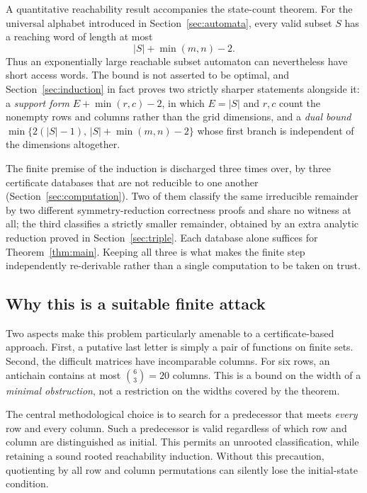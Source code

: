 \documentclass[11pt,letterpaper]{article}
\numberwithin{equation}{section}
\theoremstyle{definition}
\theoremstyle{remark}
\begin{document}
A quantitative reachability result accompanies the state-count theorem.
For the universal alphabet introduced in Section~\ref{sec:automata}, every
valid subset $S$ has a reaching word of length at most
\begin{equation}\label{eq:word-bound-intro}
 |S|+\min(m,n)-2.
\end{equation}
Thus an exponentially large reachable subset automaton can nevertheless
have short access words. The bound is not asserted to be optimal, and
Section~\ref{sec:induction} in fact proves two strictly sharper statements
alongside it: a \emph{support form} $E+\min(r,c)-2$, in which $E=|S|$ and
$r,c$ count the nonempty rows and columns rather than the grid dimensions,
and a \emph{dual bound} $\min\{2(|S|-1),\,|S|+\min(m,n)-2\}$ whose first
branch is independent of the dimensions altogether.

The finite premise of the induction is discharged three times over, by three
certificate databases that are not reducible to one another
(Section~\ref{sec:computation}). Two of them classify the same irreducible
remainder by two different symmetry-reduction correctness proofs and share no
witness at all; the third classifies a strictly smaller remainder, obtained by
an extra analytic reduction proved in Section~\ref{sec:triple}. Each database
alone suffices for Theorem~\ref{thm:main}. Keeping all three is what makes the
finite step independently re-derivable rather than a single computation to be
taken on trust.

\subsection{Why this is a suitable finite attack}
Two aspects make this problem particularly amenable to a certificate-based
approach. First, a putative last letter is simply a pair of functions on
finite sets. Second, the difficult matrices have incomparable columns.
For six rows, an antichain contains at most $\binom63=20$ columns. This is a
bound on the width of a \emph{minimal obstruction}, not a restriction on the
widths covered by the theorem.

The central methodological choice is to search for a predecessor that meets
\emph{every} row and every column. Such a predecessor is valid regardless of
which row and column are distinguished as initial. This permits an unrooted
classification, while retaining a sound rooted reachability induction.
Without this precaution, quotienting by all row and column permutations can
silently lose the initial-state condition.
\end{document}

